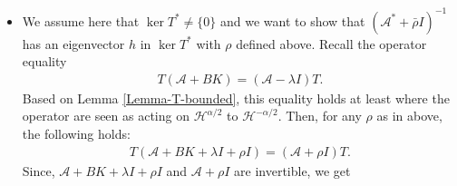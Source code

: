 \documentclass[11pt, dvipsnames]{amsart}
\begin{document}
\begin{itemize}
\begin{enumerate}
\begin{align*}
    \end{align*}
    By induction, applying $K\mathcal{A}^{-(n-1)}$ to \eqref{I-induc}, we get that
    \begin{align*}
        K(\mathcal{A}^{-n}y_k)=0,\quad \forall k\in \mathbb{N}, n\in\mathbb{N}^*.
    \end{align*}
    In particular
    \begin{align*}
        K(\mathcal{A}^{-n}y_0)=0,\quad \forall n\in\mathbb{N}^*,
    \end{align*} which implies that 
    \begin{align*}
        \sum_{m\in\mathbb{N}^*}\frac{b_m K_m}{\lambda_m^l}=0, \quad \forall l\geq 2.
    \end{align*}
    Using the holomorphic function technique in Appendix \ref{sec-appendix-q}, we get that $b_mK_m=0,$ which is a contradiction. Therefore, there exists $\varepsilon>0$ such that $\lambda(z)\neq 0$ for any $z\in \Omega$ and $|z|<\varepsilon.$ Since $\lambda(z)$ is the unique eigenvalue inside $\tilde \Omega,$ $I+\mathcal{A}^{-1}BK+z\mathcal{A}^{-1}$ is invertible.
    \end{enumerate}
    In the two cases, there exists at least a sequence of $(z_k)_{k\in \mathbb{N}}$ converging to $0$ such that $I+\mathcal{A}^{-1}BK+z_k\mathcal{A}^{-1}$ is invertible from $\mathcal{H}^{\alpha/2}$ to $\mathcal{H}^{-\alpha/2}.$  Since the spectrum of $\mathcal{A}+\rho I$ is discrete, we can find $\rho:=z_k-\lambda$ such that both $\mathcal{A}+\rho I$ and $\mathcal{A}+BK+\lambda I+\rho I=\mathcal{A}(I+\mathcal{A}^{-1}BK+z_k \mathcal{A}^{-1})$ are invertible operators from $\mathcal{H}^{\alpha/2}$ to $\mathcal{H}^{-\alpha/2}$.
    \item We assume here that $\ker T^*\neq \{0\}$ and we want to show that $(\mathcal{A}^*+\bar \rho I)^{-1}$ has an eigenvector $h$ in $\ker T^*$ with $\rho$ defined above. Recall the operator equality
    \begin{align*}
        T(\mathcal{A}+BK)=(\mathcal{A}-\lambda I)T.
    \end{align*} Based on Lemma \ref{Lemma-T-bounded}, this equality holds at least where the operator are seen as acting  on $\mathcal{H}^{\alpha/2}$ to $\mathcal{H}^{-\alpha/2}.$ Then, for any $\rho$ as in above, the following holds:
    \begin{align*}
        T(\mathcal{A}+BK+\lambda I+\rho I)=(\mathcal{A}+\rho I)T.
    \end{align*} Since, $\mathcal{A}+BK+\lambda I+\rho I$ and $\mathcal{A}+\rho I$ are invertible, we get

\end{itemize}
\end{document}
